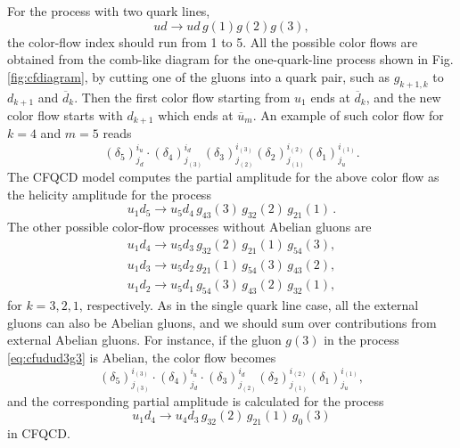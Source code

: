 \documentclass[a4paper,11pt]{article}
\begin{document}
For the process with two quark lines,
\begin{equation}
 ud\rightarrow ud\,g(1)g(2)g(3),
  \label{eq:ududg3}
\end{equation}
 the color-flow index should run from 1 to 5.
All the possible color flows are obtained from the comb-like diagram for
the one-quark-line process shown in Fig.\,\ref{fig:cfdiagram}, by cutting
one of the gluons into a quark pair, such as $g_{k+1,k}$ to $d_{k+1}$
and $\overline{d}_k$. Then the first color flow starting from $u_1$ ends at $\overline{d}_k$, and
the new color flow starts with $d_{k+1}$ which ends at
$\overline{u}_m$. An example of such color flow for $k=4$ and $m=5$ reads
\begin{equation}
 (\delta_5)^{i_u}_{j_d}\cdot(\delta_4)^{i_d}_{j_{(3)}}(\delta_3)^{i_{(3)}}_{j_{(2)}}
(\delta_2)^{i_{(2)}}_{j_{(1)}}(\delta_1)^{i_{(1)}}_{j_u}.
\end{equation}
The CFQCD model computes the partial amplitude for the above color flow
as the helicity amplitude for the process
\begin{equation}
u_1d_5\rightarrow u_5d_4\,g_{43}(3)\,g_{32}(2)\,g_{21}(1)\,.
\end{equation}
The other possible color-flow processes without Abelian gluons are
\begin{align}
u_1d_4\rightarrow u_5d_3\,g_{32}(2)\,g_{21}(1)\,g_{54}(3),\label{eq:cfudud3g3}\\
u_1d_3\rightarrow u_5d_2\,g_{21}(1)\,g_{54}(3)\,g_{43}(2),\\
u_1d_2\rightarrow u_5d_1\,g_{54}(3)\,g_{43}(2)\,g_{32}(1),
\end{align}
for $k=3,2,1$, respectively. As in the single quark line case, all the
external gluons can also be Abelian gluons, and we should sum over
contributions from external Abelian gluons. For instance, if the
gluon $g(3)$ in the process \eqref{eq:cfudud3g3} is Abelian, the color flow becomes
\begin{equation}
 (\delta_5)^{i_{(3)}}_{j_{(3)}}\cdot (\delta_4)^{i_u}_{j_d}\cdot
  (\delta_3)^{i_d}_{j_{(2)}}(\delta_2)^{i_{(2)}}_{j_{(1)}}
  (\delta_1)^{i_{(1)}}_{j_u},
\end{equation}
and the corresponding partial amplitude is calculated for the process
\begin{equation}
u_1d_4\rightarrow u_4d_3\,g_{32}(2)\,g_{21}(1)\,g_0(3)
\end{equation}
in CFQCD.
\end{document}
